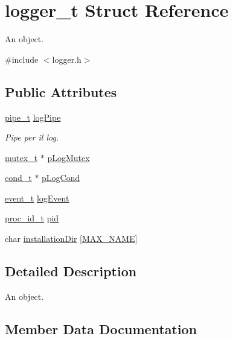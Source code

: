 \hypertarget{structlogger__t}{}\section{logger\+\_\+t Struct Reference}
\label{structlogger__t}


An object.  




{\ttfamily \#include $<$logger.\+h$>$}

\subsection*{Public Attributes}
\begin{DoxyCompactItemize}
\item 
\hyperlink{datatypes_8h_ad37b29694b7e5ee41ea19673078dc995}{pipe\+\_\+t} \hyperlink{structlogger__t_a16890b7add5181dde0138ea916a8222c}{log\+Pipe}
\begin{DoxyCompactList}\small\item\em Pipe per il log. \end{DoxyCompactList}\item 
\hyperlink{datatypes_8h_a6bfdd7a014fe4d4d6c392df201d822dd}{mutex\+\_\+t} $\ast$ \hyperlink{structlogger__t_ac1af7dd39e882cfeaffb4b77e2fa4fd7}{p\+Log\+Mutex}
\item 
\hyperlink{datatypes_8h_ab9991f7052428330da4c2fb771e0439f}{cond\+\_\+t} $\ast$ \hyperlink{structlogger__t_a573677c90c0100b6ad3697214016caf3}{p\+Log\+Cond}
\item 
\hyperlink{datatypes_8h_aaf06dbc1f07c15cb5e2779d3ec2dcb4b}{event\+\_\+t} \hyperlink{structlogger__t_a5305675a78acc22524aff8c7351904d7}{log\+Event}
\item 
\hyperlink{datatypes_8h_a03c58ad8bfbf8e14928e8f58a5f23f2e}{proc\+\_\+id\+\_\+t} \hyperlink{structlogger__t_a06d3329d87f49d3b73f7a805cfe5b61c}{pid}
\item 
char \hyperlink{structlogger__t_a366d6ff3012240669f28b0613f886c36}{installation\+Dir} \mbox{[}\hyperlink{datatypes_8h_ac7c0207aa5a0e10d378be03b68041350}{M\+A\+X\+\_\+\+N\+A\+ME}\mbox{]}
\end{DoxyCompactItemize}


\subsection{Detailed Description}
An object. 

\subsection{Member Data Documentation}
\mbox{\label{structlogger__t_a366d6ff3012240669f28b0613f886c36}} 
